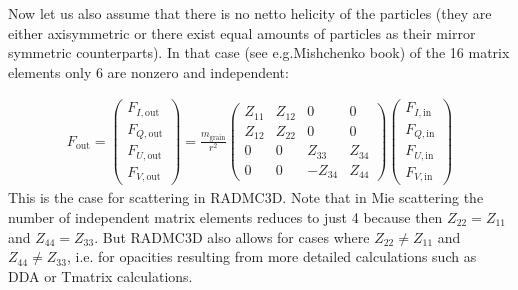 \documentclass[letterpaper,10pt,english]{sphinxmanual}
\begin{document}
Now let us also assume that there is no netto helicity of the particles
(they are either axisymmetric or there exist equal amounts of particles
as their mirror symmetric counterparts). In that case (see e.g.Mishchenko book) of the 16 matrix elements only 6 are non\sphinxhyphen{}zero and independent:

\label{\detokenize{dustradtrans:eq-scatmat-for-randorient-nohelic}}\begin{equation*}
\begin{split}F_{\mathrm{out}} = \left(\begin{matrix}
F_{I,\mathrm{out}}\\
F_{Q,\mathrm{out}}\\
F_{U,\mathrm{out}}\\
F_{V,\mathrm{out}}
\end{matrix}\right)
=\frac{m_{\mathrm{grain}}}{r^2}
\left(\begin{matrix}
Z_{11} & Z_{12} & 0 & 0 \\
Z_{12} & Z_{22} & 0 & 0 \\
0 & 0 & Z_{33} & Z_{34} \\
0 & 0 & -Z_{34} & Z_{44}
\end{matrix}\right)
\left(\begin{matrix}
F_{I,\mathrm{in}}\\
F_{Q,\mathrm{in}}\\
F_{U,\mathrm{in}}\\
F_{V,\mathrm{in}}
\end{matrix}\right)\end{split}
\end{equation*}
This is the case for scattering in RADMC\sphinxhyphen{}3D. Note that in Mie scattering the
number of independent matrix elements reduces to just 4 because then
\(Z_{22}=Z_{11}\) and \(Z_{44}=Z_{33}\). But RADMC\sphinxhyphen{}3D also allows for
cases where \(Z_{22}\neq Z_{11}\) and \(Z_{44}\neq Z_{33}\), i.e. for
opacities resulting from more detailed calculations such as DDA or T\sphinxhyphen{}matrix
calculations.
\end{document}
